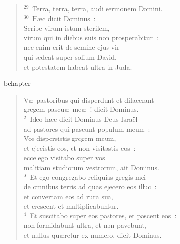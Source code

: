 \begin{flushleft}
\begin{verse}
${}^{29}$~Terra, terra, terra, audi sermonem Domini.\\
${}^{30}$~H\ae c dicit Dominus~:\\ Scribe virum istum sterilem,\\ virum qui in diebus suis non prosperabitur~:\\ nec enim erit de semine ejus vir\\ qui sedeat super solium David,\\ et potestatem habeat ultra in Juda.\end{verse}\end{flushleft}


bchapter\begin{flushleft}\begin{verse}\vspace{-19pt}\hspace{6pt}V\ae\ pastoribus qui disperdunt et dilacerant\\\hspace{6pt} gregem pascu\ae\ me\ae~! dicit Dominus.\\
${}^{2}$~Ideo h\ae c dicit Dominus Deus Isra\"el\\ ad pastores qui pascunt populum meum~:\\ Vos dispersistis gregem meum,\\ et ejecistis eos, et non visitastis eos~:\\ ecce ego visitabo super vos\\ malitiam studiorum vestrorum, ait Dominus.\\
${}^{3}$~Et ego congregabo reliquias gregis mei\\ de omnibus terris ad quas ejecero eos illuc~:\\ et convertam eos ad rura sua,\\ et crescent et multiplicabuntur.\\
${}^{4}$~Et suscitabo super eos pastores, et pascent eos~:\\ non formidabunt ultra, et non pavebunt,\\ et nullus qu\ae retur ex numero, dicit Dominus.\end{verse}\end{flushleft}


